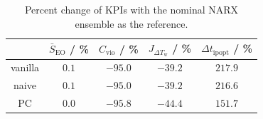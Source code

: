\begin{table}[!h]
    \centering
    \caption[Percent change of KPIs with the nominal MPC as reference.]{
        Percent change of KPIs with the nominal NARX ensemble as the reference.
    }
    \begin{tabular}{ccccc}
        \toprule
        & $\bar{S}_\text{EO}$ / \% &
        $C_\text{vio}$ / \% & $J_{\Delta T_\text{w}}$ / \% & $\Delta t_\text{ipopt}$ / \%  \\
        \midrule
        vanilla & $0.1$ & $-95.0$ & $-39.2$ & $217.9$ \\
        naive & $0.1$ & $-95.0$ & $-39.2$ & $216.6$ \\
        PC & $0.0$ & $-95.8$ & $-44.4$ & $151.7$ \\
        \bottomrule
    \end{tabular}
    \label{results:tab:MPC-improvement-percentage}
\end{table}

